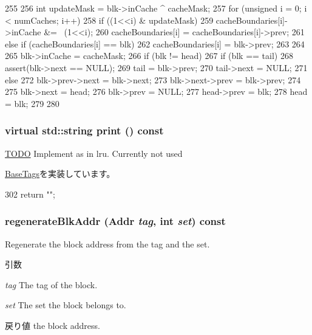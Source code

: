 \begin{DoxyCode}
255 {
256     int updateMask = blk->inCache ^ cacheMask;
257     for (unsigned i = 0; i < numCaches; i++){
258         if ((1<<i) & updateMask) {
259             cacheBoundaries[i]->inCache &= ~(1<<i);
260             cacheBoundaries[i] = cacheBoundaries[i]->prev;
261         } else if (cacheBoundaries[i] == blk) {
262             cacheBoundaries[i] = blk->prev;
263         }
264     }
265     blk->inCache = cacheMask;
266     if (blk != head) {
267         if (blk == tail){
268             assert(blk->next == NULL);
269             tail = blk->prev;
270             tail->next = NULL;
271         } else {
272             blk->prev->next = blk->next;
273             blk->next->prev = blk->prev;
274         }
275         blk->next = head;
276         blk->prev = NULL;
277         head->prev = blk;
278         head = blk;
279     }
280 }
\end{DoxyCode}
\hypertarget{classFALRU_ac07d4bdf71f061cd9dba907c905a9543}{
\subsubsection[{print}]{\setlength{\rightskip}{0pt plus 5cm}virtual std::string print () const}}
\label{classFALRU_ac07d4bdf71f061cd9dba907c905a9543}
\begin{Desc}
\item[\hyperlink{todo__todo000080}{TODO}]Implement as in lru. Currently not used \end{Desc}


\hyperlink{classBaseTags_a56a7c10391fb704ea26efc16f4f4f87b}{BaseTags}を実装しています。


\begin{DoxyCode}
302 { return ""; }
\end{DoxyCode}
\hypertarget{classFALRU_a6a30d516ca3dfb528b6e28e39b4744e8}{
\subsubsection[{regenerateBlkAddr}]{ regenerateBlkAddr ({\bf Addr} {\em tag}, \/  int {\em set}) const}}
\label{classFALRU_a6a30d516ca3dfb528b6e28e39b4744e8}
Regenerate the block address from the tag and the set. 
\begin{DoxyParams}{引数}
\item[{\em tag}]The tag of the block. \item[{\em set}]The set the block belongs to. \end{DoxyParams}
\begin{DoxyReturn}{戻り値}
the block address. 
\end{DoxyReturn}



